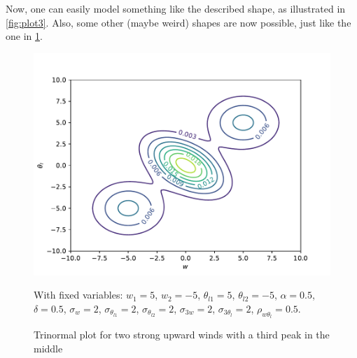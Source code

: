 Now, one can easily model something like the described shape,
as illustrated in \cref{fig:plot3}.
Also, some other (maybe weird) shapes are now possible,
just like the one in \cref{fig:plot4}.

\begin{figure}[!htb]
    \centering
    \includegraphics[width=.5\textwidth]{include/figures/plot4}
    \caption{Trinormal plot for two strong upward winds with a third peak in the middle}
    \label{fig:plot4}
    With fixed variables: $w_1 = 5$, $w_2 = -5$, $\theta_{l1} = 5$, $\theta_{l2} = -5$,
    $\alpha = 0.5$, $\delta=0.5$, $\sigma_w = 2$, $\sigma_{\theta_{l1}} = 2$,
    $\sigma_{\theta_{l2}} = 2$, $\sigma_{3w} = 2$, $\sigma_{3\theta_l} = 2$,
    $\rho_{w\theta_l} = 0.5$.
\end{figure}